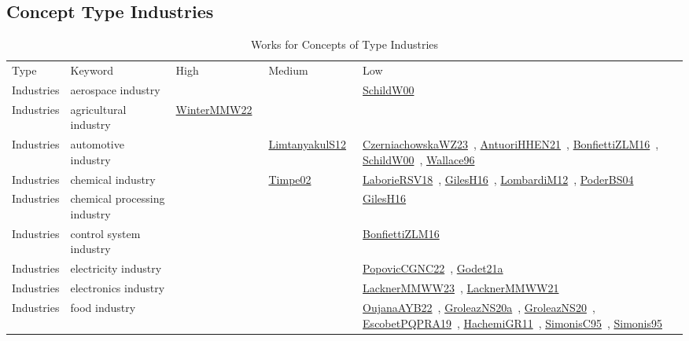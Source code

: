 \clearpage
\subsection{Concept Type Industries}
\label{sec:Industries}
{\scriptsize
\begin{longtable}{lp{3cm}>{\raggedright\arraybackslash}p{6cm}>{\raggedright\arraybackslash}p{6cm}>{\raggedright\arraybackslash}p{8cm}}
\rowcolor{white}\caption{Works for Concepts of Type Industries}\\ \toprule
\rowcolor{white}Type & Keyword & High & Medium & Low\\ \midrule\endhead
\bottomrule
\endfoot
Industries & aerospace industry &  &  & \href{works/SchildW00.pdf}{SchildW00}~\cite{SchildW00}\\
Industries & agricultural industry & \href{works/WinterMMW22.pdf}{WinterMMW22}~\cite{WinterMMW22} &  & \\
Industries & automotive industry &  & \href{works/LimtanyakulS12.pdf}{LimtanyakulS12}~\cite{LimtanyakulS12} & \href{works/CzerniachowskaWZ23.pdf}{CzerniachowskaWZ23}~\cite{CzerniachowskaWZ23}, \href{works/AntuoriHHEN21.pdf}{AntuoriHHEN21}~\cite{AntuoriHHEN21}, \href{works/BonfiettiZLM16.pdf}{BonfiettiZLM16}~\cite{BonfiettiZLM16}, \href{works/SchildW00.pdf}{SchildW00}~\cite{SchildW00}, \href{works/Wallace96.pdf}{Wallace96}~\cite{Wallace96}\\
Industries & chemical industry &  & \href{works/Timpe02.pdf}{Timpe02}~\cite{Timpe02} & \href{works/LaborieRSV18.pdf}{LaborieRSV18}~\cite{LaborieRSV18}, \href{works/GilesH16.pdf}{GilesH16}~\cite{GilesH16}, \href{works/LombardiM12.pdf}{LombardiM12}~\cite{LombardiM12}, \href{works/PoderBS04.pdf}{PoderBS04}~\cite{PoderBS04}\\
Industries & chemical processing industry &  &  & \href{works/GilesH16.pdf}{GilesH16}~\cite{GilesH16}\\
Industries & control system industry &  &  & \href{works/BonfiettiZLM16.pdf}{BonfiettiZLM16}~\cite{BonfiettiZLM16}\\
Industries & electricity industry &  &  & \href{works/PopovicCGNC22.pdf}{PopovicCGNC22}~\cite{PopovicCGNC22}, \href{works/Godet21a.pdf}{Godet21a}~\cite{Godet21a}\\
Industries & electronics industry &  &  & \href{works/LacknerMMWW23.pdf}{LacknerMMWW23}~\cite{LacknerMMWW23}, \href{works/LacknerMMWW21.pdf}{LacknerMMWW21}~\cite{LacknerMMWW21}\\
Industries & food industry &  &  & \href{works/OujanaAYB22.pdf}{OujanaAYB22}~\cite{OujanaAYB22}, \href{works/GroleazNS20a.pdf}{GroleazNS20a}~\cite{GroleazNS20a}, \href{works/GroleazNS20.pdf}{GroleazNS20}~\cite{GroleazNS20}, \href{works/EscobetPQPRA19.pdf}{EscobetPQPRA19}~\cite{EscobetPQPRA19}, \href{works/HachemiGR11.pdf}{HachemiGR11}~\cite{HachemiGR11}, \href{works/SimonisC95.pdf}{SimonisC95}~\cite{SimonisC95}, \href{works/Simonis95.pdf}{Simonis95}~\cite{Simonis95}\\

\end{longtable}}
